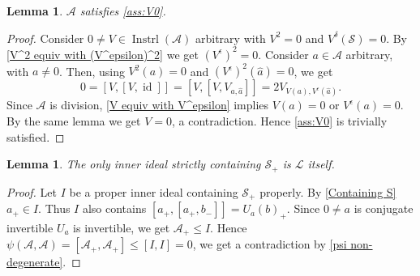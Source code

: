 \documentclass[oneside,a4paper]{amsart} %
\newtheorem{lemma}[theorem]{Lemma}
\theoremstyle{definition}
\DeclareMathOperator{\Inst}{Instrl}
\DeclareMathOperator{\id}{id}
\newcommand{\A}{\mathcal{A}}
\renewcommand{\SS}{\mathcal{S}}
\newcommand{\LL}{\mathcal{L}}
\numberwithin{equation}{section}
\begin{document}
\begin{lemma}
\label{Set Assumption}
	$\A$ satisfies \cref{ass:V0}.
\end{lemma}
\begin{proof}
	Consider $0\neq V\in\Inst(\A)$ arbitrary with $V^2=0$ and $V^\delta (\SS)=0$.
	By \cref{V^2 equiv with (V^epsilon)^2} we get $(V^\epsilon)^2=0$.
	Consider $a\in\A$ arbitrary, with $a\neq 0$.
	Then, using $V^2(a)=0$ and $(V^{\epsilon})^2(\hat a)=0$, we get  
	\[ 0=[V,[V,\id]]=[V,[V,V_{a,\hat a}]]=2V_{V(a),V^\epsilon(\hat a)}.\]
	Since $\A$ is division, \cref{V equiv with V^epsilon} implies $V(a)=0$ or $V^\epsilon (a)=0$.
	By the same lemma we get $V=0$, a contradiction. 
	Hence \cref{ass:V0} is trivially satisfied. 
\end{proof}

\begin{lemma}
\label{Moufang non S}
	The only inner ideal strictly containing $\SS_+$ is $\LL$ itself.
\end{lemma}
\begin{proof}
	Let $I$ be a proper inner ideal containing $\SS_+$ properly.
	By \cref{Containing S} $a_+\in I$.
	Thus $I$ also contains $[a_+,[a_+,b_-]]=U_a(b)_+$.
	Since $0\neq a$ is conjugate invertible $U_a$ is invertible, we get $\A_+\leq I$.
	Hence $\psi(\A,\A)=[\A_+,\A_+]\leq [I,I]=0$, we get a contradiction by \cref{psi non-degenerate}. 
\end{proof}
\end{document}
